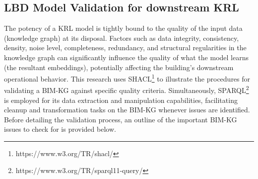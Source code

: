 \subsection{\ac{LBD} Model Validation for downstream \ac{KRL}}
The potency of a \ac{KRL} model is tightly bound to the quality of the input data (knowledge graph) at its disposal. Factors such as data integrity, consistency, density, noise level, completeness, redundancy, and structural regularities in the knowledge graph can significantly influence the quality of what the model learns (the resultant embeddings), potentially affecting the building's downstream operational behavior. This research uses \ac{SHACL}\footnote{https://www.w3.org/TR/shacl/} to illustrate the procedures for validating a \ac{BIM-KG} against specific quality criteria. Simultaneously, \ac{SPARQL}\footnote{https://www.w3.org/TR/sparql11-query/} is employed for its data extraction and manipulation capabilities, facilitating cleanup and transformation tasks on the \ac{BIM-KG} whenever issues are identified. Before detailing the validation process, an outline of the important \ac{BIM-KG} issues to check for is provided below. 

